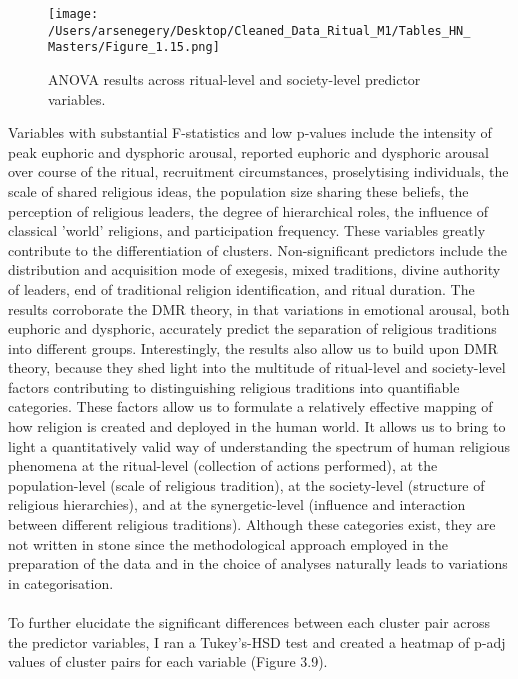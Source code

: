 \documentclass[12pt]{report}
\begin{document}
	\begin{figure}[htbp]
		\centering
		\texttt{[image: /Users/arsenegery/Desktop/Cleaned\_Data\_Ritual\_M1/Tables\_HN\_Masters/Figure\_1.15.png]} %
		\caption{ANOVA results across ritual-level and society-level predictor variables.} 
		\label{fig:table15}
	\end{figure}
	
\noindent Variables with substantial F-statistics and low p-values include the intensity of peak euphoric and dysphoric arousal, reported euphoric and dysphoric arousal over course of the ritual, recruitment circumstances, proselytising individuals, the scale of shared religious ideas, the population size sharing these beliefs, the perception of religious leaders, the degree of hierarchical roles, the influence of classical 'world' religions, and participation frequency. These variables greatly contribute to the differentiation of clusters. Non-significant predictors include the distribution and acquisition mode of exegesis, mixed traditions, divine authority of leaders, end of traditional religion identification, and ritual duration. The results corroborate the DMR theory, in that variations in emotional arousal, both euphoric and dysphoric, accurately predict the separation of religious traditions into different groups. Interestingly, the results also allow us to build upon DMR theory, because they shed light into the multitude of ritual-level and society-level factors contributing to distinguishing religious traditions into quantifiable categories. These factors allow us to formulate a relatively effective mapping of how religion is created and deployed in the human world. It allows us to bring to light a quantitatively valid way of understanding the spectrum of human religious phenomena at the ritual-level (collection of actions performed), at the population-level (scale of religious tradition), at the society-level (structure of religious hierarchies), and at the synergetic-level (influence and interaction between different religious traditions). Although these categories exist, they are not written in stone since the methodological approach employed in the preparation of the data and in the choice of analyses naturally leads to variations in categorisation.\\
\\
To further elucidate the significant differences between each cluster pair across the predictor variables, I ran a Tukey’s-HSD test and created a heatmap of p-adj values of cluster pairs for each variable (Figure 3.9).\\
\end{document}

